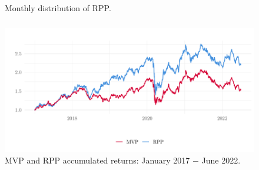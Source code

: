 \begin{frame}[t]
	\begin{figure}[H]
		\begin{adjustwidth}{1cm}{1cm}
			\begin{subfigmatrix}{2}
			\end{subfigmatrix}
			\caption{Monthly distribution of RPP.}
			\label{fig:totalRiskPPP}
		\end{adjustwidth}
	\end{figure}
\end{frame}

\begin{frame}[t]\frametitle{}\bigskip

	\begin{figure}[H]
		\centering
		\includegraphics[width=0.7\linewidth]{../figures/retornoRPPMVP.pdf}
		\caption{MVP and RPP accumulated returns: January 2017 $-$ June 2022.}
		\label{fig:retornoRPPMVP}
	\end{figure}


	


\end{frame}

